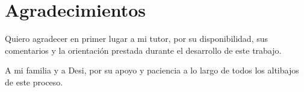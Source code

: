 


\bigskip


\begingroup

\let\clearpage\relax
\let\cleardoublepage\relax
\let\cleardoublepage\relax

\chapter*{Agradecimientos} %

Quiero agradecer en primer lugar a mi tutor, por su disponibilidad, sus comentarios y la orientación prestada durante el desarrollo de este trabajo.

A mi familia y a Desi, por su apoyo y paciencia a lo largo de todos los altibajos de este proceso.

\endgroup